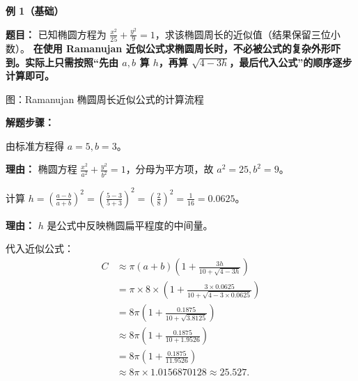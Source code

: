 \begin{examplebox}
	\textbf{\textcolor{CExample}{例 1（基础）}}

	\textbf{\textcolor{CExample}{题目：}} 已知椭圆方程为 $\frac{x^2}{25}+\frac{y^2}{9}=1$，求该椭圆周长的近似值（结果保留三位小数）。
	\textbf{在使用 Ramanujan 近似公式求椭圆周长时，不必被公式的复杂外形吓到。实际上只需按照“先由 $a,b$ 算 $h$，再算 $\sqrt{4-3h}$，最后代入公式”的顺序逐步计算即可。}
	\begin{center}
		

		\vspace{0.4em}
		{\small 图：Ramanujan 椭圆周长近似公式的计算流程}
	\end{center}
	\textbf{\textcolor{CExample}{解题步骤：}}

	\begin{description}[style=nextline, leftmargin=2.8em, labelsep=0.5em, itemsep=0.45em]
		\item[\textbf{第一步（识别参数）：}]
		      由标准方程得 $a=5,b=3$。

		      \par\textbf{理由：} 椭圆方程 $\frac{x^2}{a^2}+\frac{y^2}{b^2}=1$，分母为平方项，故 $a^2=25,b^2=9$。

		\item[\textbf{第二步（计算h）：}]
		      计算 $h=\left(\frac{a-b}{a+b}\right)^2=\left(\frac{5-3}{5+3}\right)^2=\left(\frac{2}{8}\right)^2=\frac{1}{16}=0.0625$。

		      \par\textbf{理由：} $h$ 是公式中反映椭圆扁平程度的中间量。

		\item[\textbf{第三步（代入求值）：}]
		      代入近似公式：
		      \[
			      \begin{aligned}
				      C & \approx \pi(a+b)\left(1+\frac{3h}{10+\sqrt{4-3h}}\right)                         \\
				        & = \pi\times8\times\left(1+\frac{3\times0.0625}{10+\sqrt{4-3\times0.0625}}\right) \\
				        & = 8\pi\left(1+\frac{0.1875}{10+\sqrt{3.8125}}\right)                             \\
				        & \approx 8\pi\left(1+\frac{0.1875}{10+1.9526}\right)                              \\
				        & = 8\pi\left(1+\frac{0.1875}{11.9526}\right)                                      \\
				        & \approx 8\pi\times1.0156870128 \approx 25.527.
			      \end{aligned}
		      \]


\end{description}
\end{examplebox}
